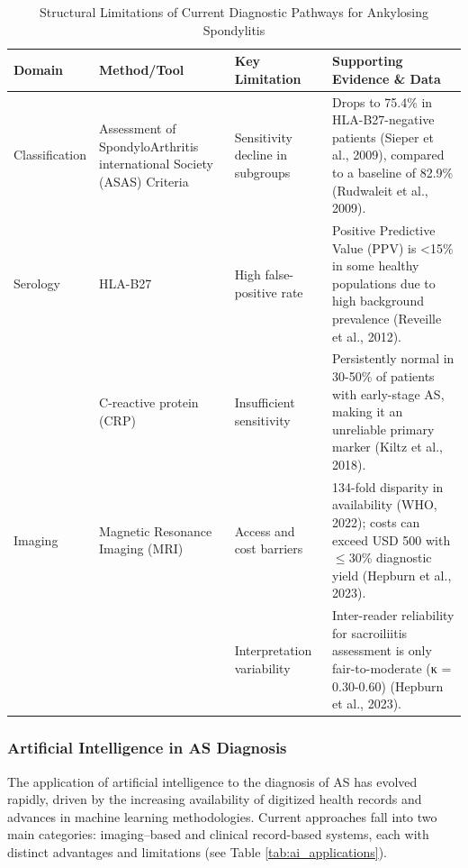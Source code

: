 \documentclass[12pt, a4paper]{article}
\begin{document}
\begin{table}[H]
\centering
\normalsize
\caption{Structural Limitations of Current Diagnostic Pathways for Ankylosing Spondylitis}
\label{tab:structural_limitations}
\begin{tabularx}{\textwidth}{p{2.5cm} p{2.5cm} p{3cm} X}
\toprule
\textbf{Domain} & \textbf{Method/Tool} & \textbf{Key Limitation} & \textbf{Supporting Evidence \& Data} \\
\midrule
Classification & Assessment of SpondyloArthritis international Society (ASAS) Criteria & Sensitivity decline in subgroups & Drops to 75.4\% in HLA-B27-negative patients (Sieper et al., 2009), compared to a baseline of 82.9\% (Rudwaleit et al., 2009). \\
\addlinespace
Serology & HLA-B27 & High false-positive rate & Positive Predictive Value (PPV) is <15\% in some healthy populations due to high background prevalence (Reveille et al., 2012). \\
\addlinespace
& C-reactive protein (CRP) & Insufficient sensitivity & Persistently normal in 30-50\% of patients with early-stage AS, making it an unreliable primary marker (Kiltz et al., 2018). \\
\addlinespace
Imaging & Magnetic Resonance Imaging (MRI) & Access and cost barriers & 134-fold disparity in availability (WHO, 2022); costs can exceed USD 500 with $\leq$30\% diagnostic yield (Hepburn et al., 2023). \\
\addlinespace
& & Interpretation variability & Inter-reader reliability for sacroiliitis assessment is only fair-to-moderate (κ = 0.30-0.60) (Hepburn et al., 2023). \\
\bottomrule
\end{tabularx}
\end{table}



\subsubsection{Artificial Intelligence in AS Diagnosis}
The application of artificial intelligence to the diagnosis of AS has evolved rapidly, driven by the increasing availability of digitized health records and advances in machine learning methodologies. Current approaches fall into two main categories: imaging--based and clinical record-based systems, each with distinct advantages and limitations (see Table \ref{tab:ai_applications}).
\end{document}

